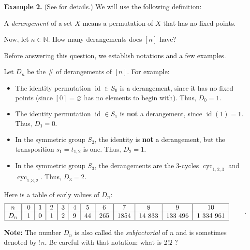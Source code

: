 \bigskip

\textbf{Example 2.} (See \cite[\S 2.9.5]{19fco} for details.) We will use the
following definition:

\begin{definition}
\label{def.pie.dera}A \emph{derangement} of a set $X$ means a permutation of
$X$ that has no fixed points.
\end{definition}

Now, let $n\in\mathbb{N}$. How many derangements does $\left[  n\right]  $ have?

Before answering this question, we establish notations and a few examples.

Let $D_{n}$ be the \# of derangements of $\left[  n\right]  $. For example:

\begin{itemize}
\item The identity permutation $\operatorname*{id}\in S_{0}$ is a derangement,
since it has no fixed points (since $\left[  0\right]  =\varnothing$ has no
elements to begin with). Thus, $D_{0}=1$.

\item The identity permutation $\operatorname*{id}\in S_{1}$ is \textbf{not} a
derangement, since $\operatorname*{id}\left(  1\right)  =1$. Thus, $D_{1}=0$.

\item In the symmetric group $S_{2}$, the identity is \textbf{not} a
derangement, but the transposition $s_{1}=t_{1,2}$ is one. Thus, $D_{2}=1$.

\item In the symmetric group $S_{3}$, the derangements are the $3$-cycles
$\operatorname*{cyc}\nolimits_{1,2,3}$ and $\operatorname*{cyc}%
\nolimits_{1,3,2}$. Thus, $D_{3}=2$.
\end{itemize}

Here is a table of early values of $D_{n}$:%
\[%
\begin{tabular}
[c]{|c||c|c|c|c|c|c|c|c|c|c|c|}\hline
$n$ & $0$ & $1$ & $2$ & $3$ & $4$ & $5$ & $6$ & $7$ & $8$ & $9$ & $10$\\\hline
$D_{n}$ & $1$ & $0$ & $1$ & $2$ & $9$ & $44$ & $265$ & $1854$ & $14\ 833$ &
$133\ 496$ & $1\ 334\ 961$\\\hline
\end{tabular}
\ \ \ \ \ \ \ .
\]


\textbf{Note:} The number $D_{n}$ is also called the \emph{subfactorial} of
$n$ and is sometimes denoted by $!n$. Be careful with that notation: what is
$2!2$ ?

